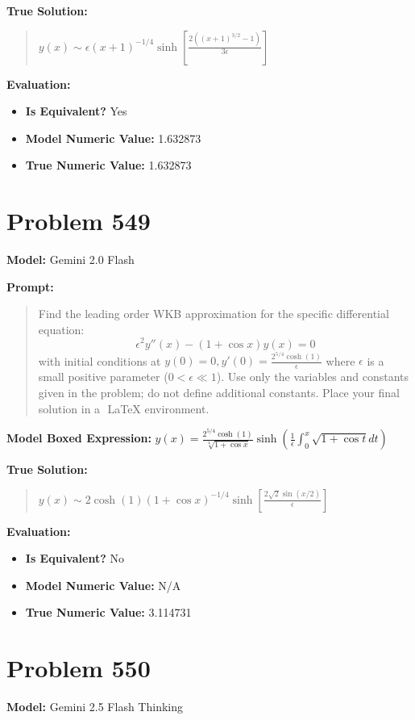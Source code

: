 \documentclass{article}
\begin{document}
\textbf{True Solution:}
\begin{quote}
$y(x) \sim \epsilon (x+1)^{-1/4}\sinh\left[\frac{2\left((x+1)^{3/2}-1\right)}{3\epsilon}\right]$
\end{quote}

\textbf{Evaluation:}
\begin{itemize}
\item \textbf{Is Equivalent?} Yes
\item \textbf{Model Numeric Value:} 1.632873
\item \textbf{True Numeric Value:} 1.632873
\end{itemize}
\vspace{1cm}
\section*{Problem 549}
\textbf{Model:} Gemini 2.0 Flash

\textbf{Prompt:}
\begin{quote}
Find the leading order WKB approximation for the specific differential equation: $$ \epsilon^2 y''(x) - (1+\cos{x}) y(x) = 0 $$ with initial conditions at $y(0) = 0, y'(0) = \frac{2^{5/4} \cosh{(1)}}{\epsilon}$ where $\epsilon$ is a small positive parameter ($0 < \epsilon \ll 1$). Use only the variables and constants given in the problem; do not define additional constants. Place your final solution in a $\boxed{}$ LaTeX environment.
\end{quote}
\textbf{Model Boxed Expression:} $y(x) = \frac{2^{5/4} \cosh{(1)}}{\sqrt[4]{1+\cos{x}}} \sinh\left(\frac{1}{\epsilon} \int_0^x \sqrt{1+\cos{t}} dt\right)$

\textbf{True Solution:}
\begin{quote}
$y(x) \sim 2\cosh(1) (1+\cos x)^{-1/4}\sinh\left[\frac{2\sqrt{2}\sin(x/2)}{\epsilon}\right]$
\end{quote}

\textbf{Evaluation:}
\begin{itemize}
\item \textbf{Is Equivalent?} No
\item \textbf{Model Numeric Value:} N/A
\item \textbf{True Numeric Value:} 3.114731
\end{itemize}
\vspace{1cm}
\section*{Problem 550}
\textbf{Model:} Gemini 2.5 Flash Thinking
\end{document}
